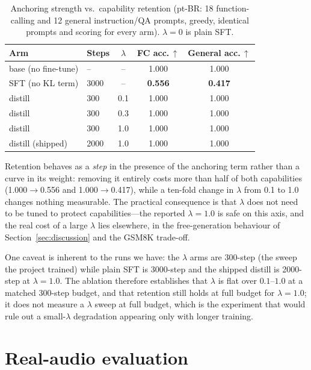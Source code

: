 \documentclass[conference]{IEEEtran}
\begin{document}
\begin{table}[t]
\centering
\caption{Anchoring strength vs.\ capability retention (pt-BR: 18 function-calling
and 12 general instruction/QA prompts, greedy, identical prompts and scoring for
every arm). $\lambda{=}0$ is plain SFT.}
\label{tab:abl_lambda}
\footnotesize
\begin{tabular}{llccc}
\toprule
Arm & Steps & $\lambda$ & FC acc.\,$\uparrow$ & General acc.\,$\uparrow$ \\
\midrule
base (no fine-tune)        & --   & --   & 1.000 & 1.000 \\
SFT (no KL term)           & 3000 & --   & \textbf{0.556} & \textbf{0.417} \\
\midrule
distill                    & 300  & 0.1  & 1.000 & 1.000 \\
distill                    & 300  & 0.3  & 1.000 & 1.000 \\
distill                    & 300  & 1.0  & 1.000 & 1.000 \\
distill (shipped)          & 2000 & 1.0  & 1.000 & 1.000 \\
\bottomrule
\end{tabular}
\end{table}

Retention behaves as a \emph{step} in the presence of the anchoring term rather
than a curve in its weight: removing it entirely costs more than half of both
capabilities (1.000$\rightarrow$0.556 and 1.000$\rightarrow$0.417), while a
ten-fold change in $\lambda$ from 0.1 to 1.0 changes nothing measurable. The
practical consequence is that $\lambda$ does not need to be tuned to protect
capabilities---the reported $\lambda{=}1.0$ is safe on this axis, and the real
cost of a large $\lambda$ lies elsewhere, in the free-generation behaviour of
Section~\ref{sec:discussion} and the GSM8K trade-off.

One caveat is inherent to the runs we have: the $\lambda$ arms are 300-step (the
sweep the project trained) while plain SFT is 3000-step and the shipped distill is
2000-step at $\lambda{=}1.0$. The ablation therefore establishes that $\lambda$ is
flat over $0.1$--$1.0$ at a matched 300-step budget, and that retention still holds
at full budget for $\lambda{=}1.0$; it does not measure a $\lambda$ sweep at full
budget, which is the experiment that would rule out a small-$\lambda$ degradation
appearing only with longer training.

\section{Real-audio evaluation}
\label{sec:audio}
\end{document}
